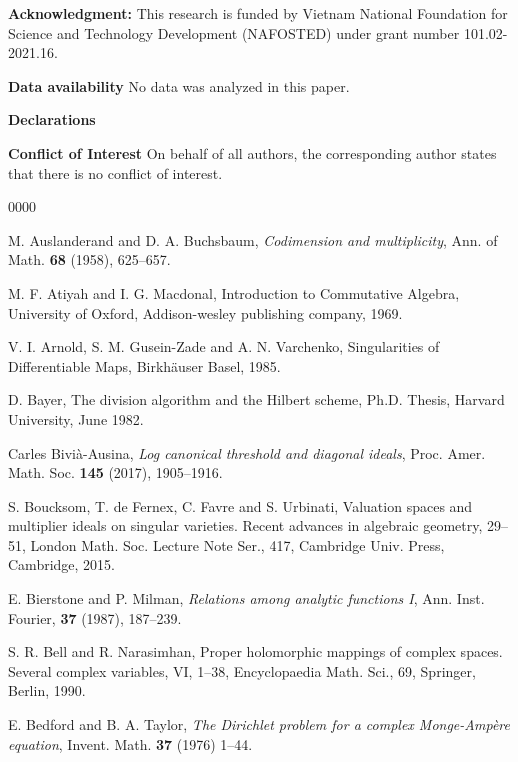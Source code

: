 \documentclass[a4paper,oneside,reqno,11pt]{article}
\def\n{\noindent}
\def\n{\noindent}
\begin{document}
\vskip 0.5cm
\n

{\bf Acknowledgment:} This research is funded by Vietnam National Foundation for Science and Technology Development (NAFOSTED) under grant number 101.02-2021.16.

\vskip 0.5cm
\n

{\bf Data availability} No data was analyzed in this paper.

\vskip 0.5cm
\n

{\bf \Large Declarations}

\vskip 0.5cm
\n

{\bf Conflict of Interest} On behalf of all authors, the corresponding author states that there is no conflict of interest.

\begin{thebibliography}{0000}

  M. Auslanderand and D. A. Buchsbaum, {\it Codimension and multiplicity}, Ann. of Math. {\bf 68} (1958), 625--657.

 M. F. Atiyah and I. G. Macdonal, Introduction to Commutative Algebra, University of Oxford, Addison-wesley publishing company, 1969.

  V. I. Arnold, S. M. Gusein-Zade and A. N. Varchenko, Singularities of Differentiable Maps, Birkh\"{a}user Basel, 1985.

 D. Bayer, The division algorithm and the Hilbert scheme, Ph.D. Thesis, Harvard University, June 1982.

 Carles Bivi\`{a}-Ausina, {\it Log canonical threshold and diagonal ideals}, Proc. Amer. Math. Soc. {\bf 145} (2017), 1905--1916.

  S. Boucksom, T. de Fernex, C. Favre and S. Urbinati, Valuation spaces and multiplier ideals on singular varieties. Recent advances in algebraic geometry, 29--51, London Math. Soc. Lecture Note Ser., 417, Cambridge Univ. Press, Cambridge, 2015.

 E. Bierstone and P. Milman, {\it Relations among analytic functions I}, Ann. Inst. Fourier, {\bf 37} (1987), 187--239.

 S. R. Bell and R. Narasimhan, Proper holomorphic mappings of complex spaces. Several complex variables, VI, 1--38, Encyclopaedia Math. Sci., 69, Springer, Berlin, 1990.

 E. Bedford and B. A. Taylor, {\it The Dirichlet problem for a complex Monge-Amp\`{e}re equation}, Invent. Math. {\bf 37} (1976) 1--44.


\end{thebibliography}
\end{document}
